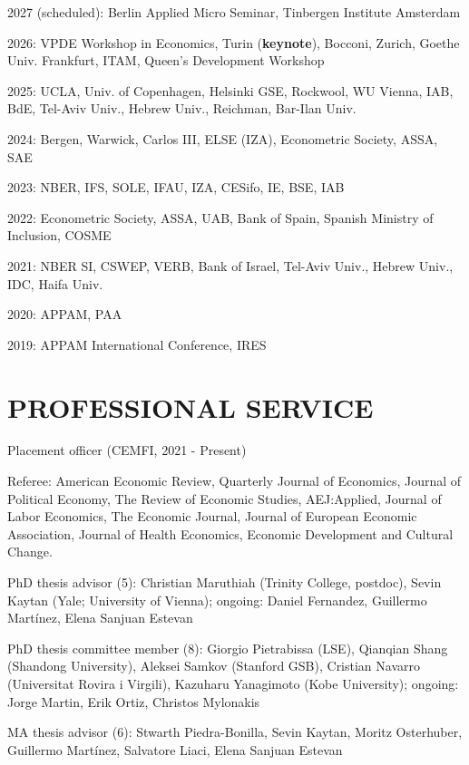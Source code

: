 \documentclass[margin]{res} %
\begin{document}
\begin{resume}
 2027 (scheduled): Berlin Applied Micro Seminar, Tinbergen Institute Amsterdam

 2026: VPDE Workshop in Economics, Turin (\textbf{keynote}), Bocconi, Zurich, Goethe Univ. Frankfurt, ITAM, Queen's Development Workshop

 2025: UCLA, Univ. of Copenhagen, Helsinki GSE, Rockwool, WU Vienna, IAB, BdE, Tel-Aviv Univ., Hebrew Univ., Reichman, Bar-Ilan Univ.

 2024: Bergen, Warwick, Carlos III, ELSE (IZA), Econometric Society, ASSA, SAE

 2023: NBER, IFS, SOLE, IFAU, IZA, CESifo, IE, BSE, IAB

 2022: Econometric Society, ASSA, UAB, Bank of Spain, Spanish Ministry of Inclusion, COSME

 2021: NBER SI, CSWEP, VERB, Bank of Israel, Tel-Aviv Univ., Hebrew Univ., IDC, Haifa Univ.

 2020: APPAM, PAA

 2019: APPAM International Conference, IRES

\newpage
\section{PROFESSIONAL SERVICE} 

Placement officer (CEMFI, 2021 - Present)

Referee: American Economic Review, Quarterly Journal of Economics, Journal of Political Economy, The Review of Economic Studies, AEJ:Applied, Journal of Labor Economics, The Economic Journal, Journal of European Economic Association, Journal of Health Economics, Economic Development and Cultural Change.

PhD thesis advisor (5): Christian Maruthiah (Trinity College, postdoc), Sevin Kaytan (Yale; University of Vienna); ongoing: Daniel Fernandez, Guillermo Martínez, Elena Sanjuan Estevan

PhD thesis committee member (8): Giorgio Pietrabissa (LSE), Qianqian Shang (Shandong University), Aleksei Samkov (Stanford GSB), Cristian Navarro (Universitat Rovira i Virgili), Kazuharu Yanagimoto (Kobe University); ongoing: Jorge Martin, Erik Ortiz, Christos Mylonakis

MA thesis advisor (6): Stwarth Piedra-Bonilla, Sevin Kaytan, Moritz Osterhuber, Guillermo Martínez, Salvatore Liaci, Elena Sanjuan Estevan


\end{resume}
\end{document}
